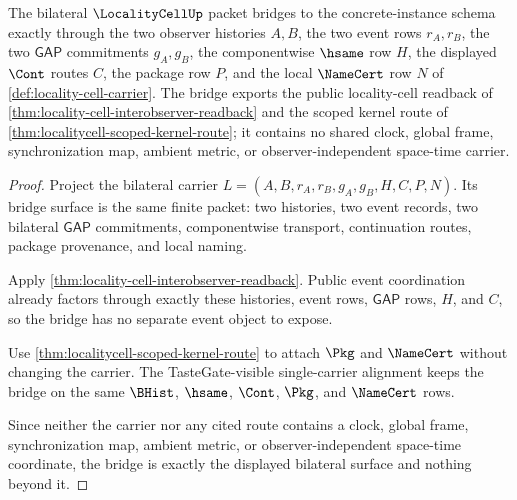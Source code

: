 \begin{theorem}
\label{thm:locality-cell-standard-bridge-surface}
The bilateral $\LocalityCellUp$ packet bridges to the concrete-instance schema exactly through the two observer histories $A,B$, the two event rows $r_A,r_B$, the two $\mathsf{GAP}$ commitments $g_A,g_B$, the componentwise $\hsame$ row $H$, the displayed $\Cont$ routes $C$, the package row $P$, and the local $\NameCert$ row $N$ of \autoref{def:locality-cell-carrier}. The bridge exports the public locality-cell readback of \autoref{thm:locality-cell-interobserver-readback} and the scoped kernel route of \autoref{thm:localitycell-scoped-kernel-route}; it contains no shared clock, global frame, synchronization map, ambient metric, or observer-independent space-time carrier.
\end{theorem}
\begin{proof}
Project the bilateral carrier $L=(A,B,r_A,r_B,g_A,g_B,H,C,P,N)$. Its bridge surface is the same finite packet: two histories, two event records, two bilateral $\mathsf{GAP}$ commitments, componentwise transport, continuation routes, package provenance, and local naming.

Apply \autoref{thm:locality-cell-interobserver-readback}. Public event coordination already factors through exactly these histories, event rows, $\mathsf{GAP}$ rows, $H$, and $C$, so the bridge has no separate event object to expose.

Use \autoref{thm:localitycell-scoped-kernel-route} to attach $\Pkg$ and $\NameCert$ without changing the carrier. The TasteGate-visible single-carrier alignment keeps the bridge on the same $\BHist$, $\hsame$, $\Cont$, $\Pkg$, and $\NameCert$ rows.

Since neither the carrier nor any cited route contains a clock, global frame, synchronization map, ambient metric, or observer-independent space-time coordinate, the bridge is exactly the displayed bilateral surface and nothing beyond it.
\end{proof}


